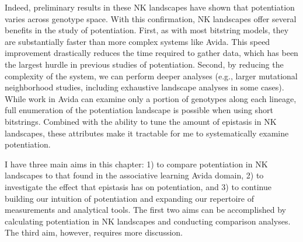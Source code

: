 Indeed, preliminary results in these NK landscapes have shown that potentiation varies across genotype space. 
With this confirmation, NK landscapes offer several benefits in the study of potentiation. 
First, as with most bitstring models, they are substantially faster than more complex systems like Avida. 
This speed improvement drastically reduces the time required to gather data, which has been the largest hurdle in previous studies of potentiation. 
Second, by reducing the complexity of the system, we can perform deeper analyses (e.g., larger mutational neighborhood studies, including exhaustive landscape analyses in some cases). 
While work in Avida can examine only a portion of genotypes along each lineage, full enumeration of the potentiation landscape is possible when using short bitstrings. 
Combined with the ability to tune the amount of epistasis in NK landscapes, these attributes make it tractable for me to systematically examine potentiation. %

I have three main aims in this chapter: 
1) to compare potentiation in NK landscapes to that found in the associative learning Avida domain,
2) to investigate the effect that epistasis has on potentiation, 
and 3) to continue building our intuition of potentiation and expanding our repertoire of measurements and analytical tools. %
The first two aims can be accomplished by calculating potentiation in NK landscapes and conducting comparison analyses. %
The third aim, however, requires more discussion.

